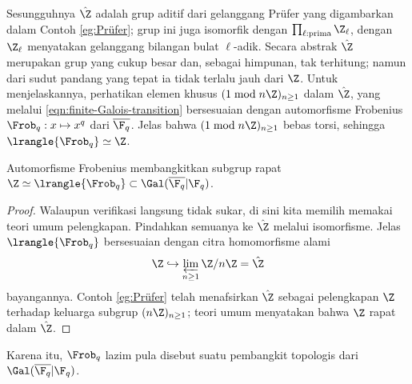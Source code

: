 Sesungguhnya $\hat{\Z}$ adalah grup aditif dari gelanggang Prüfer yang digambarkan dalam Contoh \ref{eg:Prüfer}; grup ini juga isomorfik dengan $\prod_{\ell: \text{prima}} \Z_\ell$, dengan $\Z_{\ell}$ menyatakan gelanggang bilangan bulat $\ell$-adik. Secara abstrak $\hat{\Z}$ merupakan grup yang cukup besar dan, sebagai himpunan, tak terhitung; namun dari sudut pandang yang tepat ia tidak terlalu jauh dari $\Z$. Untuk menjelaskannya, perhatikan elemen khusus $(1 \bmod n\Z)_{n \geq 1}$ dalam $\hat{\Z}$, yang melalui \eqref{eqn:finite-Galois-transition} bersesuaian dengan automorfisme Frobenius $\Frob_q: x \mapsto x^q$ dari $\overline{\F_q}$. Jelas bahwa $(1 \bmod n\Z)_{n \geq 1}$ bebas torsi, sehingga $\lrangle{\Frob_q} \simeq \Z$.

\begin{lemma}
	Automorfisme Frobenius membangkitkan subgrup rapat $\Z\simeq\lrangle{\Frob_q}\subset\Gal(\overline{\F_q}|\F_q)$.
\end{lemma}
\begin{proof}
	Walaupun verifikasi langsung tidak sukar, di sini kita memilih memakai teori umum pelengkapan. Pindahkan semuanya ke $\hat{\Z}$ melalui isomorfisme. Jelas $\lrangle{\Frob_q}$ bersesuaian dengan citra homomorfisme alami
	\[ \Z \hookrightarrow \varprojlim_{n \geq 1} \Z/n\Z = \hat{\Z} \]
	bayangannya. Contoh \ref{eg:Prüfer} telah menafsirkan $\hat{\Z}$ sebagai pelengkapan $\Z$ terhadap keluarga subgrup $(n\Z)_{n \geq 1}$; teori umum menyatakan bahwa $\Z$ rapat dalam $\hat{\Z}$.
\end{proof}
Karena itu, $\Frob_q$ lazim pula disebut suatu pembangkit topologis dari $\Gal(\overline{\F_q}|\F_q)$.

